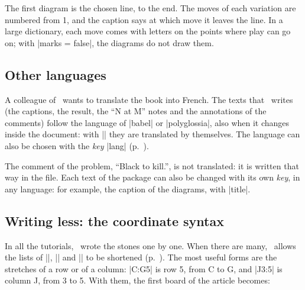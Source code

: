 \begin{goban}

The first diagram is the chosen line, to the end. The moves of each variation are numbered from 1, and the caption says at which move it leaves the line. In a large dictionary, each move comes with letters on the points where play can go on; with |marks = false|, the diagrams do not draw them.

\subsection{Other languages}
\label{tut:idiomas}

A colleague of \karu\ wants to translate the book into French. The texts that \pgfgoname\ writes (the captions, the result, the ``N at M'' notes and the annotations of the comments) follow the language of |babel| or |polyglossia|, also when it changes inside the document: with || they are translated by themselves. The language can also be chosen with the \emph{key} |lang| (p.~\pageref{subsec:idiomas}).

\begin{codeexample}

\end{codeexample}

\begingroup
{}

\endgroup

The comment of the problem, ``Black to kill.'', is not translated: it is written that way in the file. Each text of the package can also be changed with its own \emph{key}, in any language: for example, the caption of the diagrams, with |title|.

\begin{codeexample}
\end{codeexample}

\subsection{Writing less: the coordinate syntax}
\label{tut:abreviar}

In all the tutorials, \karu\ wrote the stones one by one. When there are many, \pgfgoname\ allows the lists of |\stones|, |\marks| and |\prisoners| to be shortened (p.~\pageref{subsec:sintaxis-de-coordenadas}). The most useful forms are the stretches of a row or of a column: |C:G5| is row 5, from C to G, and |J3:5| is column J, from 3 to 5. With them, the first board of the article becomes:


\end{goban}
